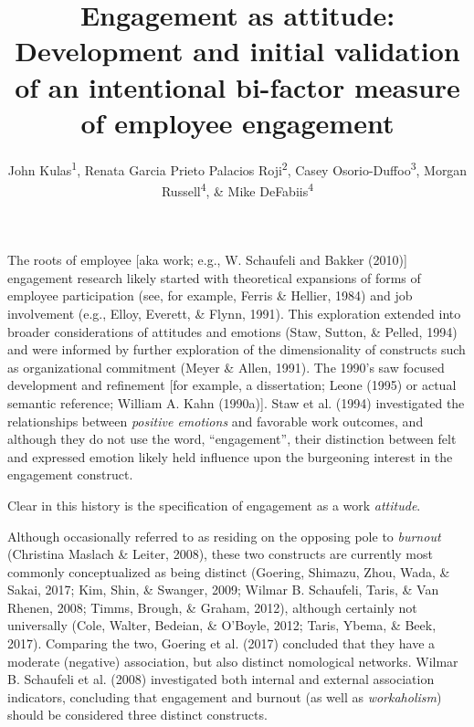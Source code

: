\documentclass[
  man]{apa6}
\title{Engagement as attitude: Development and initial validation of an intentional bi-factor measure of employee engagement}
\author{John Kulas\textsuperscript{1}, Renata Garcia Prieto Palacios Roji\textsuperscript{2}, Casey Osorio-Duffoo\textsuperscript{3}, Morgan Russell\textsuperscript{4}, \& Mike DeFabiis\textsuperscript{4}}
\date{}
\affiliation{\vspace{0.5cm}\textsuperscript{1} eRg\\\textsuperscript{2} PepsiCo\\\textsuperscript{3} Harver\\\textsuperscript{4} Montclair State University}
\begin{document}
\maketitle

The roots of employee {[}aka work; e.g., W. Schaufeli and Bakker (2010){]} engagement research likely started with theoretical expansions of forms of employee participation (see, for example, Ferris \& Hellier, 1984) and job involvement (e.g., Elloy, Everett, \& Flynn, 1991). This exploration extended into broader considerations of attitudes and emotions (Staw, Sutton, \& Pelled, 1994) and were informed by further exploration of the dimensionality of constructs such as organizational commitment (Meyer \& Allen, 1991). The 1990's saw focused development and refinement {[}for example, a dissertation; Leone (1995) or actual semantic reference; William A. Kahn (1990a){]}. Staw et al. (1994) investigated the relationships between \emph{positive emotions} and favorable work outcomes, and although they do not use the word, ``engagement'', their distinction between felt and expressed emotion likely held influence upon the burgeoning interest in the engagement construct.

Clear in this history is the specification of engagement as a work \emph{attitude}.

Although occasionally referred to as residing on the opposing pole to \emph{burnout} (Christina Maslach \& Leiter, 2008), these two constructs are currently most commonly conceptualized as being distinct (Goering, Shimazu, Zhou, Wada, \& Sakai, 2017; Kim, Shin, \& Swanger, 2009; Wilmar B. Schaufeli, Taris, \& Van Rhenen, 2008; Timms, Brough, \& Graham, 2012), although certainly not universally (Cole, Walter, Bedeian, \& O'Boyle, 2012; Taris, Ybema, \& Beek, 2017). Comparing the two, Goering et al. (2017) concluded that they have a moderate (negative) association, but also distinct nomological networks. Wilmar B. Schaufeli et al. (2008) investigated both internal and external association indicators, concluding that engagement and burnout (as well as \emph{workaholism}) should be considered three distinct constructs.
\end{document}
